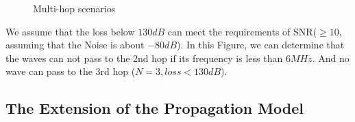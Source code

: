\documentclass{mcmthesis}
\begin{document}
      \begin{figure}[!t]
      \centering
      \caption{ Multi-hop scenarios }
      \label{fig:Multi_hop_sc}
      \end{figure}

      We assume that the loss below $130dB$ can meet the requirements of SNR($\ge 10$, assuming that the Noise is about $-80dB$). In this Figure, we can determine that the waves can not pass to the 2nd hop if its frequency is less than $6MHz$. And no wave can pass to the 3rd hop ($N = 3, loss < 130dB$).

    \subsection{The Extension of the Propagation Model}
\end{document}
